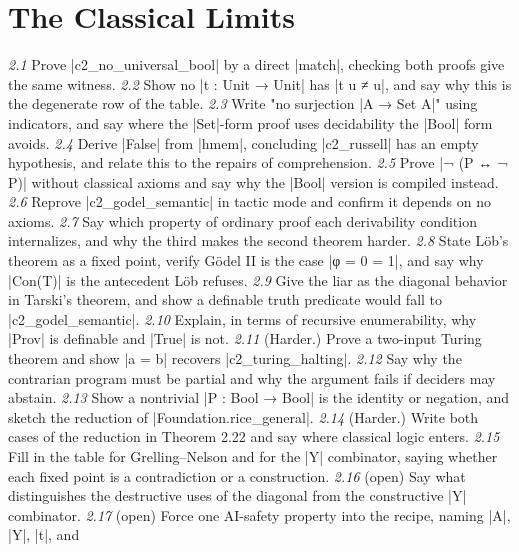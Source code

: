 \documentclass{memoir}
\begin{document}
\section{The Classical Limits}\label{Two--Schemas--of--Impossibility-005F-005F-005F--Machine--Checked--Limits--of--Trustworthy--Machine--Learning-005F-005F-005F--and--Why--They--Tighten--with--Capability----Exercises----The--Classical--Limits}

\emph{2.1} Prove \LeanVerb|c2_no_universal_bool| by a direct \LeanVerb|match|, checking both proofs
give the same witness.
\emph{2.2} Show no \LeanVerb|t : Unit → Unit| has \LeanVerb|t u ≠ u|, and say why this is the degenerate row
of the table.
\emph{2.3} Write "no surjection \LeanVerb|A → Set A|" using indicators, and say where the \LeanVerb|Set|-form
proof uses decidability the \LeanVerb|Bool| form avoids.
\emph{2.4} Derive \LeanVerb|False| from \LeanVerb|hmem|, concluding \LeanVerb|c2_russell| has an empty
hypothesis, and relate this to the repairs of comprehension.
\emph{2.5} Prove \LeanVerb|¬ (P ↔ ¬ P)| without classical axioms and say why the \LeanVerb|Bool| version is
compiled instead.
\emph{2.6} Reprove \LeanVerb|c2_godel_semantic| in tactic mode and confirm it depends on no
axioms.
\emph{2.7} Say which property of ordinary proof each derivability condition internalizes,
and why the third makes the second theorem harder.
\emph{2.8} State Löb's theorem as a fixed point, verify Gödel II is the case \LeanVerb|φ = 0 = 1|,
and say why \LeanVerb|Con(T)| is the antecedent Löb refuses.
\emph{2.9} Give the liar as the diagonal behavior in Tarski's theorem, and show a definable
truth predicate would fall to \LeanVerb|c2_godel_semantic|.
\emph{2.10} Explain, in terms of recursive enumerability, why \LeanVerb|Prov| is definable and
\LeanVerb|True| is not.
\emph{2.11} (Harder.) Prove a two-input Turing theorem and show \LeanVerb|a = b| recovers
\LeanVerb|c2_turing_halting|.
\emph{2.12} Say why the contrarian program must be partial and why the argument fails if
deciders may abstain.
\emph{2.13} Show a nontrivial \LeanVerb|P : Bool → Bool| is the identity or negation, and sketch the
reduction of \LeanVerb|Foundation.rice_general|.
\emph{2.14} (Harder.) Write both cases of the reduction in Theorem 2.22 and say where
classical logic enters.
\emph{2.15} Fill in the table for Grelling–Nelson and for the \LeanVerb|Y| combinator, saying
whether each fixed point is a contradiction or a construction.
\emph{2.16} (open) Say what distinguishes the destructive uses of the diagonal from the
constructive \LeanVerb|Y| combinator.
\emph{2.17} (open) Force one AI-safety property into the recipe, naming \LeanVerb|A|, \LeanVerb|Y|, \LeanVerb|t|, and
\end{document}
